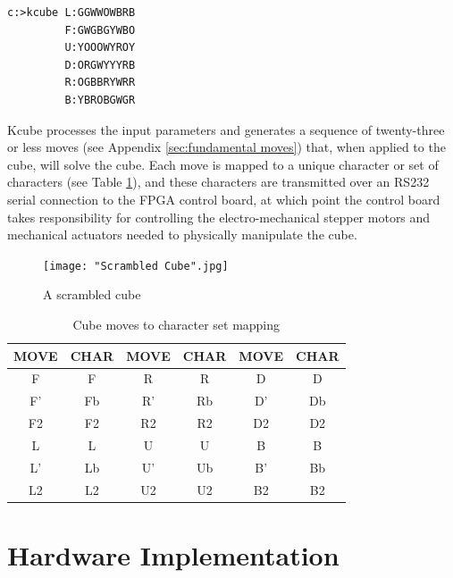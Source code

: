 \documentclass[final, letterpaper, 10 pt, conference, twocolumn]{IEEEtran}
\begin{document}
\begin{lstlisting}[style=DOS]
c:>kcube L:GGWWOWBRB
         F:GWGBGYWBO
         U:YOOOWYROY
         D:ORGWYYYRB
         R:OGBBRYWRR
         B:YBROBGWGR
\end{lstlisting}

Kcube processes the input parameters and generates a sequence of twenty-three or less moves (see Appendix \ref{sec:fundamental moves}) that, when applied to the cube, will solve the cube. Each move is mapped to a unique character or set of characters (see Table \ref{table:moves table}), and these characters are transmitted over an RS232 serial connection to the FPGA control board, at which point the control board takes responsibility for controlling the electro-mechanical stepper motors and mechanical actuators needed to physically manipulate the cube.

\begin{figure}[!hb]
\centering
\texttt{[image: "Scrambled Cube".jpg]}
\caption{A scrambled cube}
\label{fig:scrambled cube}
\end{figure}

\begin{table}[!ht]
\caption{Cube moves to character set mapping}
\label{table:moves table}
\centering
\begin{tabular}{|c|c|c|c|c|c|}
\hline
\textbf{MOVE} & \textbf{CHAR} & \textbf{MOVE} & \textbf{CHAR} & \textbf{MOVE} & \textbf{CHAR} \\ \hline
F             & F              & R             & R              & D             & D             \\ \hline
F'            & Fb              & R'            & Rb              & D'            & Db            \\ \hline
F2            & F2              & R2            & R2              & D2            & D2             \\ \hline
L             & L              & U             & U             & B             & B             \\ \hline
L'            & Lb              & U'            & Ub             & B'            & Bb             \\ \hline
L2            & L2              & U2            & U2             & B2            & B2             \\ \hline
\end{tabular}
\end{table}

\section{Hardware Implementation}
\end{document}
